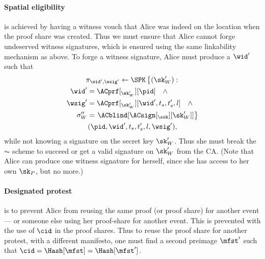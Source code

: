 \paragraph{Spatial eligibility}%
\label{analysis-spatial}

 is achieved by having a witness vouch that Alice was 
indeed on the location when the proof share was created.
Thus we must ensure that Alice cannot forge undeserved witness signatures, which 
is ensured using the same linkability mechanism as above.
To forge a witness signature, Alice must produce a \(\wid'\) such that
\begin{multline*}
  \pi_{\wid', \wsig'}\gets \SPK\left\{ (\sk_W') : \right. \\
    \begin{aligned}
      \wid' &= \ACprf[_{\sk_W'}][\pid] \quad \land \\
      \wsig' &= \ACprf[_{\sk_W'}][\wid', t_s, t_s', l] \quad \land \\
      \sigma_W'' &= \left. \ACblind[\ACsign[_{\ssk}][\sk_W']] \right\}
    \end{aligned} \\
      (\pid, \wid', t_s, t_s', l, \wsig'),
\end{multline*}
while not knowing a signature on the secret key \(\sk_W'\).
Thus she must break the \(\AC\) scheme to succeed or get a valid signature on 
\(\sk_W'\) from the \ac{CA}.
(Note that Alice can produce one witness signature for herself, since she has 
access to her own \(\sk_P\), but no more.)

\paragraph{Designated protest}%
\label{analysis-designated}

 is to prevent Alice from reusing the same proof (or proof 
share) for another event --- or someone else using her proof-share for another 
event.
This is prevented with the use of \(\cid\) in the proof shares.
Thus to reuse the proof share for another protest, with a different manifesto, 
one must find a second preimage \(\mfst'\) such that \(\cid = \Hash[\mfst] = 
  \Hash[\mfst']\).

%
%

